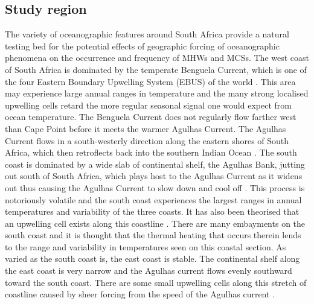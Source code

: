\documentclass[a4paper,10pt,review]{elsarticle}
\begin{document}
\subsection{Study region}
The variety of oceanographic features around South Africa provide a natural testing bed for the potential effects of geographic forcing of oceanographic phenomena on the occurrence and frequency of MHWs and MCSs. The west coast of South Africa is dominated by the temperate Benguela Current, which is one of the four Eastern Boundary Upwelling System (EBUS) of the world \cite{Hutchings2009}. This area may experience large annual ranges in temperature and the many strong localised upwelling cells retard the more regular seasonal signal one would expect from ocean temperature. The Benguela Current does not regularly flow farther west than Cape Point before it meets the warmer Agulhas Current. The Agulhas Current flows in a south-westerly direction along the eastern shores of South Africa, which then retroflects back into the southern Indian Ocean \cite{Hutchings2009}. The south coast is dominated by a wide slab of continental shelf, the Agulhas Bank, jutting out south of South Africa, which plays host to the Agulhas Current as it widens out thus causing the Agulhas Current to slow down and cool off \cite{Roberts2005}. This process is notoriously volatile and the south coast experiences the largest ranges in annual temperatures and variability of the three coasts. It has also been theorised that an upwelling cell exists along this coastline  \cite{Roberts2005}. There are many embayments on the south coast and it is thought that the thermal heating that occurs therein lends to the range and variability in temperatures seen on this coastal section. As varied as the south coast is, the east coast is stable. The continental shelf along the east coast is very narrow and the Agulhas current flows evenly southward toward the south coast. There are some small upwelling cells along this stretch of coastline caused by sheer forcing from the speed of the Agulhas current \cite{Lutjeharms2003}.
\end{document}
